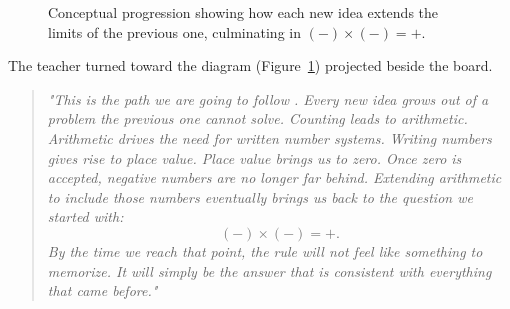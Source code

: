 \documentclass[11pt]{article}
\begin{document}
\begin{figure}[htbp]
\centering


\caption{
Conceptual progression showing how each new idea extends the limits of the previous one, culminating in \((-) \times (-)=+\).
}

\label{fig:roadmap}

\end{figure}

The teacher turned toward the diagram (Figure~\ref{fig:roadmap}) projected beside the board.
\begin{quote}
\emph{"This is the path we are going to follow . Every new idea grows out of a problem the previous one cannot solve. Counting leads to arithmetic. Arithmetic drives the need for written number systems.  Writing numbers gives rise to place value. Place value brings us to zero. Once zero is accepted, negative numbers are no longer far behind. Extending arithmetic to include those numbers eventually brings us back to the question we started with:
\[(-)\times(-)=+.\]
By the time we reach that point, the rule will not feel like something to memorize. It will simply be the answer that is consistent with everything that came before."}
\end{quote}
\end{document}
